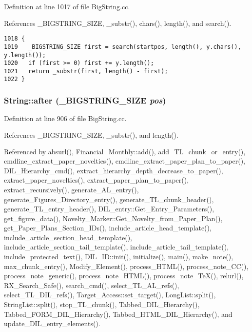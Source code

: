 Definition at line 1017 of file Big\-String.cc.

References \_\-BIGSTRING\_\-SIZE, \_\-substr(), chars(), length(), and search().



\footnotesize\begin{verbatim}1018 {
1019   _BIGSTRING_SIZE first = search(startpos, length(), y.chars(), y.length());
1020   if (first >= 0) first += y.length();
1021   return _substr(first, length() - first);
1022 }
\end{verbatim}\normalsize 
{}
\subsubsection{ String::after ({\bf \_\-BIGSTRING\_\-SIZE} {\em pos})}\label{classString_a76}




Definition at line 906 of file Big\-String.cc.

References \_\-BIGSTRING\_\-SIZE, \_\-substr(), and length().

Referenced by absurl(), Financial\_\-Monthly::add(), add\_\-TL\_\-chunk\_\-or\_\-entry(), cmdline\_\-extract\_\-paper\_\-novelties(), cmdline\_\-extract\_\-paper\_\-plan\_\-to\_\-paper(), DIL\_\-Hierarchy\_\-cmd(), extract\_\-hierarchy\_\-depth\_\-decrease\_\-to\_\-paper(), extract\_\-paper\_\-novelties(), extract\_\-paper\_\-plan\_\-to\_\-paper(), extract\_\-recursively(), generate\_\-AL\_\-entry(), generate\_\-Figures\_\-Directory\_\-entry(), generate\_\-TL\_\-chunk\_\-header(), generate\_\-TL\_\-entry\_\-header(), DIL\_\-entry::Get\_\-Entry\_\-Parameters(), get\_\-figure\_\-data(), Novelty\_\-Marker::Get\_\-Novelty\_\-from\_\-Paper\_\-Plan(), get\_\-Paper\_\-Plans\_\-Section\_\-IDs(), include\_\-article\_\-head\_\-template(), include\_\-article\_\-section\_\-head\_\-template(), include\_\-article\_\-section\_\-tail\_\-template(), include\_\-article\_\-tail\_\-template(), include\_\-protected\_\-text(), DIL\_\-ID::init(), initialize(), main(), make\_\-note(), max\_\-chunk\_\-entry(), Modify\_\-Element(), process\_\-HTML(), process\_\-note\_\-CC(), process\_\-note\_\-generic(), process\_\-note\_\-HTML(), process\_\-note\_\-Te\-X(), relurl(), RX\_\-Search\_\-Safe(), search\_\-cmd(), select\_\-TL\_\-AL\_\-refs(), select\_\-TL\_\-DIL\_\-refs(), Target\_\-Access::set\_\-target(), Long\-List::split(), String\-List::split(), stop\_\-TL\_\-chunk(), Tabbed\_\-DIL\_\-Hierarchy(), Tabbed\_\-FORM\_\-DIL\_\-Hierarchy(), Tabbed\_\-HTML\_\-DIL\_\-Hierarchy(), and update\_\-DIL\_\-entry\_\-elements().



